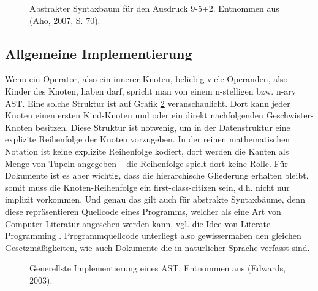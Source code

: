 
\begin{figure}[h!]
\centering
{}
\caption[Abstrakter Syntaxbaum Beispiel]{ Abstrakter Syntaxbaum für den Ausdruck 9-5+2. Entnommen aus (Aho, 2007, S. 70). }\label{ast}
\end{figure}
 
\subsection{Allgemeine Implementierung}\label{}
 
Wenn ein Operator, also ein innerer Knoten, beliebig viele Operanden, also Kinder des Knoten, haben darf, spricht man von einem n-stelligen bzw. n-ary AST. \citep{Edwards} Eine solche Struktur ist auf Grafik \ref{astimpl} veranschaulicht. Dort kann jeder Knoten einen ersten Kind-Knoten und oder ein direkt nachfolgenden Geschwister-Knoten besitzen. Diese Struktur ist notwenig, um in der Datenstruktur eine explizite Reihenfolge der Knoten vorzugeben. In der reinen mathematischen Notation ist keine explizite Reihenfolge kodiert, dort werden die Kanten als Menge von Tupeln angegeben -- die Reihenfolge spielt dort keine Rolle. Für Dokumente ist es aber wichtig, dass die hierarchische Gliederung erhalten bleibt, somit muss die Knoten-Reihenfolge ein first-class-citizen sein, d.h. nicht nur implizit vorkommen. Und genau das gilt auch für abstrakte Syntaxbäume, denn diese repräsentieren Quellcode eines Programms, welcher als eine Art von Computer-Literatur angesehen werden kann, vgl. die Idee von Literate-Programming \citep{Knuth}. Programmquellcode unterliegt also gewissermaßen den gleichen Gesetzmäßigkeiten, wie auch Dokumente die in natürlicher Sprache verfasst sind.

 
\begin{figure}[h!]
\centering
{}
\caption[Generellste Implementierung eines AST]{ Generellste Implementierung eines AST. Entnommen aus (Edwards, 2003). }\label{astimpl}
\end{figure}
 
